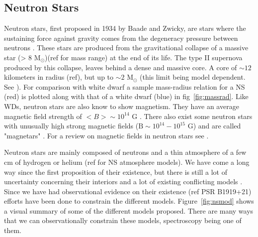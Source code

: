 \subsection{Neutron Stars}\label{sec:ns}

Neutron stars, first proposed in 1934 by Baade and Zwicky,  are stars where the sustaining force against gravity comes from  the degeneracy pressure between neutrons \citep{baade_cosmic_1934}. These stars are produced from the gravitational collapse of a massive star (> 8 M$_\odot$)(ref for mass range) at the end of its life. The type II supernova produced by this collapse, leaves behind a dense and massive core. A core of $\sim 12$ kilometers in radius (ref), but up to $\sim 2$ M$_\odot$ (this limit being model dependent. See \citep{lattimer_neutron_2007}). For comparison with white dwarf a sample mass-radius relation for a NS (red) is plotted along with that of a white dwarf (blue) in fig~\ref{fig:massrad}. Like WDs, neutron stars are also know to show magnetism. They have an average magnetic field strength of $<B>\sim 10^{14}$ G \citep{beskin2015magnetic}. There also exist some neutron stars with unusually high strong magnetic fields ($\text{B}\sim 10^{14} - 10^{15}\text{ G}$) and are called "magnetars" \citep{duncan_formation_1992}. For a review on magnetic fields in neutron stars see \cite{reisenegger_magnetic_2005}. 

Neutron stars are mainly composed of neutrons and a thin atmosphere of a few cm of hydrogen or helium (ref for NS atmosphere models). We have come a long way since the first proposition of their existence, but there is still a lot of  uncertainty concerning their interiors and a lot of existing conflicting models \citep{lattimer_neutron_2007}. Since we have had observational evidence on their existence (ref PSR B1919+21) efforts have been done to constrain the different models. Figure~\ref{fig:nsmod} shows a visual summary of some of the different models proposed. There are many ways that we can observationally constrain these models, spectroscopy being one of them.

